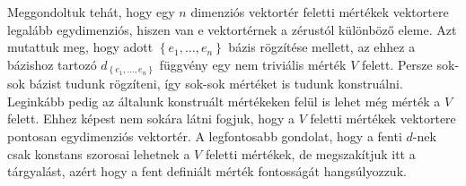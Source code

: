 \documentclass[9pt, a4paper, showtrims]{memoir}
\theoremstyle{plain}
\theoremstyle{remark}
\theoremstyle{definition}
\begin{document}
Meggondoltuk tehát,
hogy egy $n$ dimenziós vektortér feletti mértékek vektortere legalább egydimenziós,
hiszen van e vektortérnek a zérustól különböző eleme.
Azt mutattuk meg, hogy
adott $\left\{ e_1,\ldots,e_n \right\}$ bázis rögzítése mellett,
az ehhez a bázishoz tartozó $d_{\left\{ e_1,\ldots,e_n \right\}}$ függvény egy nem triviális mérték $V$ felett.
Persze sok-sok bázist tudunk rögzíteni, így sok-sok mértéket is tudunk konstruálni.
Leginkább pedig az általunk konstruált mértékeken felül is lehet még mérték a $V$ felett.
Ehhez képest nem sokára látni fogjuk,
hogy a $V$ feletti mértékek vektortere pontosan egydimenziós vektortér.
A legfontosabb gondolat, hogy a fenti $d$-nek csak konstans szorosai lehetnek a $V$ feletti mértékek,
de megszakítjuk itt a tárgyalást, azért hogy a fent definiált mérték fontosságát hangsúlyozzuk.
\end{document}
